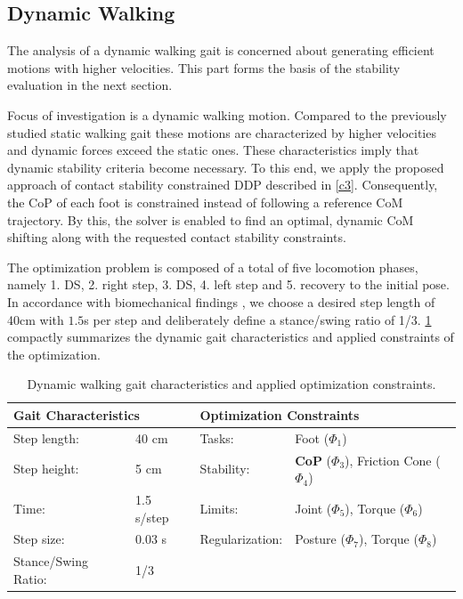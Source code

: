 \subsection{Dynamic Walking}
The analysis of a dynamic walking gait is concerned about generating efficient motions with higher velocities. This part forms the basis of the stability evaluation in the next section.

Focus of investigation is a dynamic walking motion. Compared to the previously studied static walking gait these motions are characterized by higher velocities and dynamic forces exceed the static ones. These characteristics imply that dynamic stability criteria become necessary. To this end, we apply the proposed approach of contact stability constrained DDP described in \cref{c3}. Consequently, the \gls{CoP} of each foot is constrained instead of following a reference \gls{CoM} trajectory. By this, the solver is enabled to find an optimal, dynamic \gls{CoM} shifting along with the requested contact stability constraints. 

The optimization problem is composed of a total of five locomotion phases, namely 1. \gls{DS}, 2. right step, 3. \gls{DS}, 4. left step and 5. recovery to the initial pose. In accordance with biomechanical findings \cite{kuo2001simple}, we choose a desired step length of 40cm with $1.5$s per step and deliberately define a stance/swing ratio of 1/3. \cref{tab:walkDynamic} compactly summarizes the dynamic gait characteristics and applied constraints of the optimization.

\begin{table}[]
\centering
\caption{Dynamic walking gait characteristics and applied optimization constraints.}
\begin{tabular}{|ll|ll|}
\hline
\multicolumn{2}{|l|}{\textbf{Gait Characteristics}} & \multicolumn{2}{l|}{\textbf{Optimization Constraints}} \\ \hline
Step length:& 40 cm 	& Tasks: 			& Foot ($\Phi_1$)\\ \hline
Step height:& 5 cm 	& Stability: 		& \textbf{\gls{CoP}} ($\Phi_3$), Friction Cone ($\Phi_4$)\\ \hline
Time:& 1.5 s/step	& Limits: 			& Joint ($\Phi_5$), Torque ($\Phi_6$)\\ \hline
Step size:& 0.03 s	& Regularization: 	& Posture ($\Phi_7$), Torque ($\Phi_8$)\\ \hline
Stance/Swing Ratio:& 1/3 & & \\ \hline
\end{tabular}
\label{tab:walkDynamic}
\end{table} 

